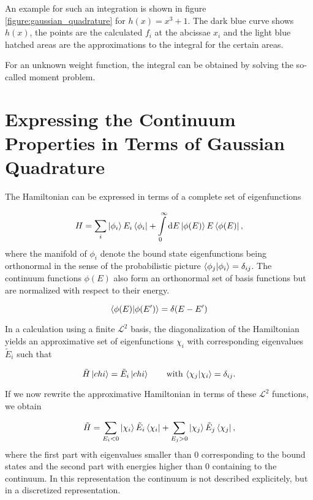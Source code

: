 An example for such an integration is shown in figure \ref{figure:gaussian_quadrature}
for $h(x) = x^3 + 1$. The dark blue curve shows $h(x)$, the points are the
calculated $f_i$ at the abcissae $x_i$ and the light blue hatched areas are the
approximations to the integral for the certain areas.

For an unknown weight function, the integral can be obtained by solving the so-called
moment problem.




\section{Expressing the Continuum Properties in Terms of Gaussian Quadrature}
The Hamiltonian can be expressed in terms of a complete set of eigenfunctions

\begin{equation}
  H = \sum\limits_i \ket{\phi_i} E_i \bra{\phi_i}
     + \int\limits_0^\infty \mathrm{d}E \ket{\phi(E)} E \bra{\phi(E)}  ,
\end{equation}
where the manifold of $\phi_i$ denote the bound state eigenfunctions being orthonormal
in the sense of the probabilistic picture $\braket{\phi_j|\phi_i} = \delta_{ij}$.
The continuum functions $\phi(E)$ also form an orthonormal set of basis functions
but are normalized with respect to their energy.

\begin{equation}
  \braket{\phi(E) | \phi(E')} = \delta(E-E')
\end{equation}

In a calculation using a finite $\mathcal{L}^2$ basis, the diagonalization of the
Hamiltonian yields an approximative set of eigenfunctions $\chi_i$ with corresponding
eigenvalues $\tilde{E}_i$ such that

\begin{equation}
  \tilde{H} \ket{chi} = \tilde{E}_i \ket{chi} \quad\quad \text{with} \,
  \braket{\chi_j|\chi_i} = \delta_{ij} .
\end{equation}

If we now rewrite the approximative Hamiltonian in terms of these $\mathcal{L}^2$
functions, we obtain

\begin{equation}
  \tilde{H} = \sum\limits_{E_i<0} \ket{\chi_i} \tilde{E}_i \bra{\chi_i}
            + \sum\limits_{E_j>0} \ket{\chi_j} \tilde{E}_j \bra{\chi_j}   ,
\end{equation}
where the first part with eigenvalues smaller than 0 corresponding to the
bound states and the second part with energies higher than 0 containing to
the continuum. In this representation the continuum is not described explicitely,
but in a discretized representation.

